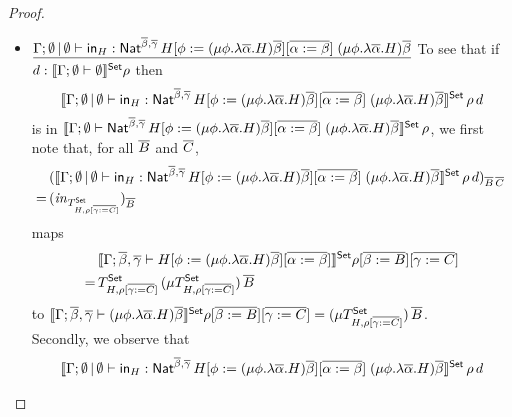 \documentclass[runningheads]{llncs}
\newcommand{\set}{\mathsf{Set}}
\begin{document}
\begin{proof}
\begin{itemize}
\item
$\underline{\Gamma;\emptyset \,|\, \emptyset \vdash \mathsf{in}_H :
  \mathsf{Nat}^{\overline{\beta},\overline{\gamma}} \, H[\phi := (\mu \phi.\lambda
    {\overline \alpha}.H){\overline \beta}][\overline{\alpha := \beta}]
  \;(\mu \phi.\lambda {\overline \alpha}.H){\overline \beta}}$\; To
  see that if $d : \setsem{\Gamma;\emptyset \vdash \emptyset} \rho$
  then $$\setsem{\Gamma;\emptyset \,|\, \emptyset \vdash \tin_H :
    \Nat^{\ol{\beta},\ol{\gamma}} \, H[\phi := (\mu \phi.\lambda
      {\overline \alpha}.H){\overline \beta}][\ol{\alpha := \beta}]
    \;(\mu \phi.\lambda {\overline \alpha}.H){\overline \beta}}\,
  \rho\,d$$ 
  is in $\setsem{\Gamma;\emptyset \vdash
    \Nat^{\ol{\beta},\ol{\gamma}} \, H[\phi := (\mu \phi.\lambda
      {\overline \alpha}.H){\overline \beta}][\ol{\alpha := \beta}]
    \;(\mu \phi.\lambda {\overline \alpha}.H){\overline \beta}}\,
  \rho$, we first note that, for all $\overline{B}$ and $\overline{C}$,
  \begin{align*}
    &(\setsem{\Gamma;\emptyset \,|\, \emptyset \vdash \tin_H :
    \Nat^{\ol{\beta},\ol{\gamma}} \, H[\phi := (\mu \phi.\lambda
      {\overline \alpha}.H){\overline \beta}][\ol{\alpha := \beta}]
    \;(\mu \phi.\lambda {\overline \alpha}.H){\overline \beta}}\,
  \rho\,d)_{\ol{B}\,\ol{C}}\, \\
    =\,
    &(\mathit{in}_{T^\set_{H,\rho[\ol{\gamma := C}]}})_{\ol{B}}
  \end{align*}
  maps
  \begin{align*}
    &\setsem{\Gamma;\ol{\beta},\ol{\gamma} \vdash H[\phi := (\mu
      \phi.\lambda {\overline \alpha}.H){\overline \beta}][\ol{\alpha
        := \beta}]}\rho[\ol{\beta := B}][\ol{\gamma := C}] 
        \\ = \,
    &T^\set_{H,\rho[\ol{\gamma := C}]}\, (\mu T^\set_{H,\rho[\ol{\gamma
        := C}]}) \, \ol{B}
  \end{align*}
        to $\setsem{\Gamma;\ol{\beta},\ol{\gamma}
    \vdash (\mu \phi.\lambda {\overline \alpha}.H){\overline \beta}}
  \rho[\ol{\beta := B}][\ol{\gamma := C}] = (\mu
  T^\set_{H,\rho[\ol{\gamma := C}]}) \, \ol{B}$.  \\
  Secondly, we observe
  that
  \begin{align*}
    &\setsem{\Gamma;\emptyset \,|\, \emptyset \vdash \tin_H :
    \Nat^{\ol{\beta},\ol{\gamma}} \, H[\phi := (\mu \phi.\lambda
      {\overline \alpha}.H){\overline \beta}][\ol{\alpha := \beta}]
    \;(\mu \phi.\lambda {\overline \alpha}.H){\overline
      \beta}}\,\rho\,d \\ 

\end{align*}
\end{itemize}
\end{proof}
\end{document}
